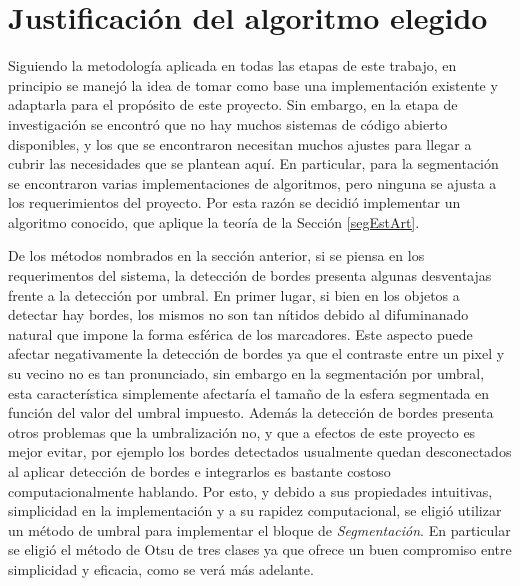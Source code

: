 

\section{Justificación del algoritmo elegido}

Siguiendo la metodología aplicada en todas las etapas de este trabajo, en principio se manejó la idea de tomar como base una implementación existente y adaptarla para el propósito de este proyecto. Sin embargo, en la etapa de investigación se encontró que no hay muchos sistemas de código abierto disponibles, y los que se encontraron necesitan muchos ajustes para llegar a cubrir las necesidades que se plantean aquí. En particular, para la segmentación se encontraron varias implementaciones de algoritmos, pero ninguna se ajusta a los requerimientos del proyecto. Por esta razón se decidió implementar un algoritmo conocido, que aplique la teoría de la Sección \ref{segEstArt}.

De los métodos nombrados en la sección anterior, si se piensa en los requerimentos del sistema, la detección de bordes presenta algunas desventajas frente a la detección por umbral. En primer lugar, si bien en los objetos a detectar hay bordes, los mismos no son tan nítidos debido al difuminanado natural que impone la forma esférica de los marcadores. Este aspecto puede afectar negativamente la detección de bordes ya que el contraste entre un pixel y su vecino no es tan pronunciado, sin embargo en la segmentación por umbral, esta característica simplemente afectaría el tamaño de la esfera segmentada en función del valor del umbral impuesto. Además la detección de bordes presenta otros problemas que la umbralización no, y que a efectos de este proyecto es mejor evitar, por ejemplo los bordes detectados usualmente quedan desconectados al aplicar detección de bordes e integrarlos es bastante costoso computacionalmente hablando. Por esto, y debido a sus propiedades intuitivas, simplicidad en la implementación y a su rapidez computacional, se eligió utilizar un método de umbral para implementar el bloque de \emph{Segmentación}. En particular se eligió el método de Otsu \cite{otsu} de tres clases ya que ofrece un buen compromiso entre simplicidad y eficacia, como se verá más adelante. 

